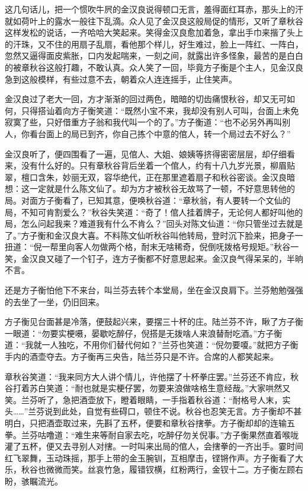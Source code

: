 \documentclass[12pt,UTF8]{ctexbook}
\begin{document}
{{{这几句话儿，把一个惯吹牛屄的金汉良说得顿口无言，羞得面红耳赤，那头上的汗就如荷叶上的露水一般往下乱滴。众人见了金汉良这般局促的情形，又听了章秋谷这样发松的说话，一齐哈哈大笑起来。笑得金汉良愈加着急，拿出手巾来揩了头上的汗珠，又不住的用扇子乱扇，看他那个样儿，好生难过，脸上一阵红、一阵白，忽然又逼得面皮紫胀，口内发起喘来，一刻之间，就露出许多怪象，最苦的是白白的被章秋谷这般打趣，不敢认真。众人笑了一回，毕竟方子衡是个主人，见金汉良急到这般模样，有些过意不去，朝着众人连连摇手，止住笑声。

金汉良过了老大一回，方才渐渐的回过两色，暗暗的切齿痛恨秋谷，却又无可如何，只得搭讪着向方子衡笑道：“既然小宝不来，我却没有别人可叫，台面上未免寂寞了些，只好借重方子翁和我代叫一个的了。”方子衡道：“也不必另外再叫别人，你看台面上的局已到齐，你自己拣个中意的倌人，转一个局过去不好么？”

金汉良听了，便四围看了一遍，见倌人、大姐、娘姨等挤得密密层层，却仔细看来，没有什么好的。只有章秋谷背后坐着一个倌人，约有十八九岁光景，柳眉贴翠，檀口含朱，妙丽无双，容华绝代，正在那里遮着扇子和秋谷密谈。金汉良暗想：这一定就是什么陈文仙了。却为方才被秋谷无故骂了一顿，不好意思转他的局。对面方子衡看了，已知其意，便唤秋谷道：“章秋翁，有人要转一个文仙的局，不知可肯割爱么？”秋谷失笑道：“奇了！倌人挂着牌子，无论何人都好叫他的局，怎么问起我来？难道我有什么不肯么？”回头对陈文仙道：“你只管坐过去就是了。”方子衡和金汉良大喜。不料陈文仙听秋谷叫他转局，登时沉下脸来，把身子一扭道：“倪一帮里向客人勿做两个格，耐末无啥稀奇，倪倒呒拨格号规矩。”秋谷一笑，金汉良又碰了一个钉子，连方子衡都不好意思起来。金汉良气得呆呆的，半晌不言。

还是方子衡怕他下不来台，叫兰芬去转个本堂局，坐在金汉良肩下。兰芬勉勉强强的去坐了一坐，仍旧回来。

方子衡见台面甚是冷落，便鼓起兴来，要摆三十杯的庄。陆兰芬不许，瞅了方子衡一眼道：“勿要实梗嗫，晏歇吃醉仔，倪搭是无拨啥人来浪替耐吃酒。”方子衡道：“我就一人独吃，不用你们替代何如？”兰芬也笑道：“倪勿要嗄。”就把方子衡手内的酒壶夺去。方子衡再三央告，陆兰芬只是不许。合席的人都笑起来。

章秋谷笑道：“我来同方大人讲个情儿，许他摆了十杯拳庄罢。”兰芬还不肯应，秋谷打着苏白笑道：“耐也就是实梗仔罢，勿要来浪做啥格生意经哉。”大家哄然又笑。兰芬听了，急把酒壶放下，瞪着眼睛，一手指着秋谷道：“耐格号人末，实头……”兰芬说到此处，自觉有些碍口，顿住不说。秋谷也忍笑无言。方子衡却不甚明白，只把酒壶取过来，先斟了五杯，便要和章秋谷搳拳。方子衡却却的连输五拳。兰芬咕噜道：“难生来等耐自家去吃，吃醉仔勿关倪事。”方子衡果然直着喉咙灌了五杯，便又去寻别人对搳。一时叫来出局的倌人，会搳拳的一齐出手。霎时间红飞翠舞，玉动珠摇，那手上带的金玉腕钏，互相摩击，铿锵作声。方子衡看了大乐，秋谷也微微而笑。丝哀竹急，履错钗横，红粉两行，金钗十二。方子衡左顾右盼，骇瞩流光。

}}}
\end{document}
